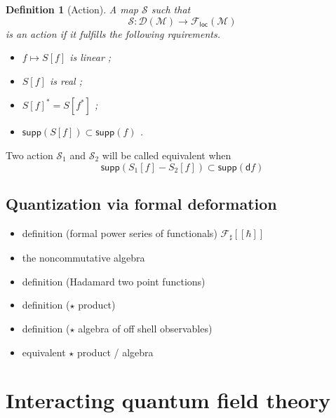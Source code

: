 \documentclass[10pt]{book}
\newcommand{\supp}{\mathsf{supp}}
\newcommand{\Dcal}{\mathcal{D}}
\newcommand{\Fcal}{\mathcal{F}}
\newcommand{\Mcal}{\mathcal{M}}
\newcommand{\Scal}{\mathcal{S}}
\newcommand{\dsf}{\mathsf{d}}
\theoremstyle{break}
\newtheorem{definition}{Definition}
\begin{document}
\begin{definition}[Action]
A map $\Scal$ such that
%
\begin{equation*}
\Scal : \Dcal(\Mcal) \to \Fcal_{\mathsf{loc}}(\Mcal) 
\end{equation*}
%
is an action if it fulfills the following rquirements.
%
\begin{itemize}
\item $f \mapsto S[f]$ is linear ;
\item $S[f]$ is real ;
\item $S[f]^\ast = S[f^\ast]$ ;
\item $\supp\left( S[f] \right) \subset \supp\left( f \right)$ .
\end{itemize}
%
\end{definition}

Two action $\Scal_1$ and $\Scal_2$ will be called equivalent when
%
\begin{equation*}
\supp\left( S_1[f] - S_2[f] \right) \subset \supp\left( \dsf f \right) 
\end{equation*}




\section{Quantization via formal deformation}

\begin{itemize}
\item definition (formal power series of functionals) $\Fcal_\sharp[[\hbar]]$
\item the noncommutative algebra
\item definition (Hadamard two point functions)
\item definition ($\star$ product)
\item definition ($\star$ algebra of off shell observables)
\item equivalent $\star$ product / algebra
\end{itemize}



\chapter{Interacting quantum field theory}
\end{document}
